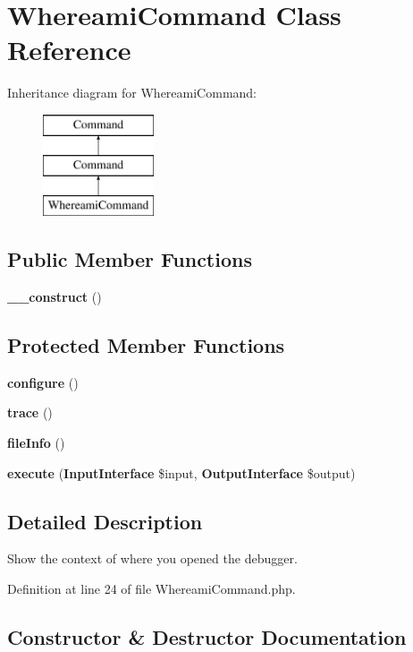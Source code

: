 \section{Whereami\+Command Class Reference}
\label{class_psy_1_1_command_1_1_whereami_command}
Inheritance diagram for Whereami\+Command\+:\begin{figure}[H]
\begin{center}
\leavevmode
\includegraphics[height=3.000000cm]{class_psy_1_1_command_1_1_whereami_command}
\end{center}
\end{figure}
\subsection*{Public Member Functions}
\begin{DoxyCompactItemize}
\item 
{\bf \+\_\+\+\_\+construct} ()
\end{DoxyCompactItemize}
\subsection*{Protected Member Functions}
\begin{DoxyCompactItemize}
\item 
{\bf configure} ()
\item 
{\bf trace} ()
\item 
{\bf file\+Info} ()
\item 
{\bf execute} ({\bf Input\+Interface} \$input, {\bf Output\+Interface} \$output)
\end{DoxyCompactItemize}


\subsection{Detailed Description}
Show the context of where you opened the debugger. 

Definition at line 24 of file Whereami\+Command.\+php.



\subsection{Constructor \& Destructor Documentation}
